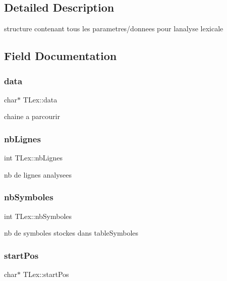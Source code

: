 \subsection{Detailed Description}
structure contenant tous les parametres/donnees pour l\textquotesingle{}analyse lexicale 

\subsection{Field Documentation}
\mbox{\label{structTLex_a2242e630c3f871659c3e36b101b504b4}} 
\subsubsection{\texorpdfstring{data}{data}}
{\footnotesize\ttfamily char$\ast$ T\+Lex\+::data}

chaine a parcourir \mbox{\label{structTLex_a74499b75b25dc1bce1fb2f66af6ce1e2}} 
\subsubsection{\texorpdfstring{nb\+Lignes}{nbLignes}}
{\footnotesize\ttfamily int T\+Lex\+::nb\+Lignes}

nb de lignes analysees \mbox{\label{structTLex_a84d0d3a30f4b42f8db675f8cbb60373f}} 
\subsubsection{\texorpdfstring{nb\+Symboles}{nbSymboles}}
{\footnotesize\ttfamily int T\+Lex\+::nb\+Symboles}

nb de symboles stockes dans table\+Symboles \mbox{\label{structTLex_a1122e1ced17c2c07f7975b4f11110ad8}} 
\subsubsection{\texorpdfstring{start\+Pos}{startPos}}
{\footnotesize\ttfamily char$\ast$ T\+Lex\+::start\+Pos}

